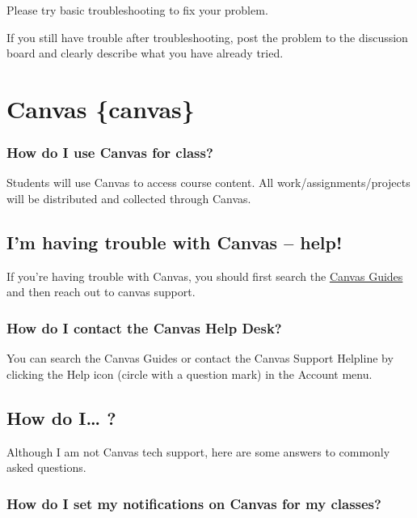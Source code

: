 Please try basic troubleshooting to fix your problem.

If you still have trouble after troubleshooting, post the problem to the discussion board and clearly describe what you have already tried.

\hypertarget{canvas-canvas}{%
\section{Canvas \{canvas\}}\label{canvas-canvas}}

\hypertarget{how-do-i-use-canvas-for-class}{%
\subsubsection{How do I use Canvas for class?}\label{how-do-i-use-canvas-for-class}}

Students will use Canvas to access course content.
All work/assignments/projects will be distributed and collected through Canvas.

\hypertarget{im-having-trouble-with-canvas-help}{%
\subsection{I'm having trouble with Canvas -- help!}\label{im-having-trouble-with-canvas-help}}

If you're having trouble with Canvas, you should first search the \href{https://community.canvaslms.com/t5/Canvas-Basics-Guide/tkb-p/basics}{Canvas Guides} and then reach out to canvas support.

\hypertarget{how-do-i-contact-the-canvas-help-desk}{%
\subsubsection{How do I contact the Canvas Help Desk?}\label{how-do-i-contact-the-canvas-help-desk}}

You can search the Canvas Guides or contact the Canvas Support Helpline by clicking the Help icon (circle with a question mark) in the Account menu.

\hypertarget{how-do-i}{%
\subsection{How do I\ldots{} ?}\label{how-do-i}}

Although I am not Canvas tech support, here are some answers to commonly asked questions.

\hypertarget{how-do-i-set-my-notifications-on-canvas-for-my-classes}{%
\subsubsection{How do I set my notifications on Canvas for my classes?}\label{how-do-i-set-my-notifications-on-canvas-for-my-classes}}

